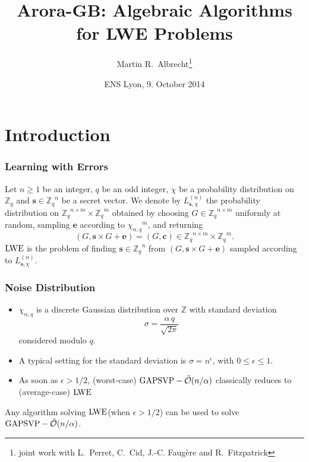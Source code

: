 \documentclass[10pt]{beamer}
\title{Arora-GB: Algebraic Algorithms for LWE Problems}
\author[Martin R.\ Albrecht]{Martin R.\ Albrecht\footnote{joint work with L.\ Perret, C.\ Cid, J.-C. Faugère and R.\ Fitzpatrick}}
\institute{Information Security Group, Royal Holloway, University of London}
\date{ENS Lyon, 9. October 2014}
\newcommand{\tildeO}[1]{\ensuremath{\tilde{\mathcal{O}}(#1)}\xspace}
\newcommand{\chig}{\ensuremath{\chi_{\alpha,q}}}
\newcommand{\Z}{\ensuremath{\mathbb{Z}}}
\newcommand{\Zq}{\ensuremath{\mathbb{Z}_q}}
\newcommand{\Ldis}{L_{\mathbf{s},\chi}^{(n)}}
\newcommand{\svec}{\ensuremath{\mathbf{s}}\xspace}
\newcommand\LWE{\ensuremath{{\rm LWE}}\xspace}
\renewcommand{\vec}[1]{\mathbf{#1}\xspace}
\begin{document}
\begin{frame}[plain] %
  \titlepage
\end{frame}


\section{Introduction}

\begin{frame}
\frametitle{Learning with Errors}

\begin{definition}[LWE]\label{def:lwe}
Let $n\ge 1$ be an integer, $q$ be an odd integer, $\chi$ be a probability distribution on $\Zq$ and \svec $\in \Zq^n$ be a secret vector. We denote by $\Ldis$ the probability distribution on $\Zq^{n \times m}\times \Zq^{m}$ 
obtained by choosing $G\in \Zq^{n \times m}$  uniformly at random, sampling $\vec{e}$ according to $\chig^{m}$, and returning $$(G,\vec{s} \times G+\vec{e})=(G,\vec{c}) \in \Zq^{n \times m}\times \Zq^{m}.$$ \LWE is the problem of finding $\svec \in \Zq^{n}$ from $(G,\vec{s} \times G+\mathbf{e})$ sampled according to $\Ldis$.
\end{definition}

\end{frame}


\begin{frame}
\frametitle{Noise Distribution}
\begin{itemize}
  \item $\chig$ is a discrete Gaussian distribution over $\Z$ with standard deviation $$\sigma = \frac{\alpha\, q}{\sqrt{2\pi}}$$ considered modulo $q$.
  \item A typical setting for the standard deviation is $\sigma=n^{\epsilon}$, with $0 \leq \epsilon \leq 1$. 
  \item As soon as $\epsilon >  1/2$, (worst-case) ${\rm GAPSVP}-\tildeO{n/\alpha}$ classically reduces to (average-case) \LWE
\end{itemize}

\begin{block}{}
Any algorithm solving  \LWE (when $\epsilon > 1/2$) can be used to solve ${\rm GAPSVP}-\tildeO{n/\alpha}$.
\end{block}
\end{frame}
\end{document}
